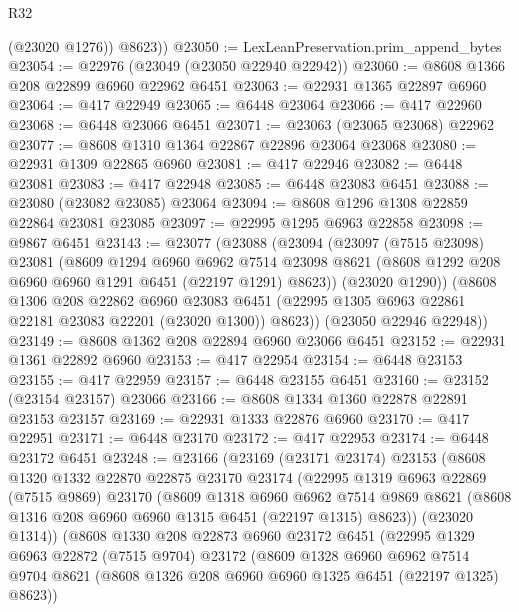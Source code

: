 \begin{lexlean}{R32}
\begin{coremodule}
          (@23020 @1276))
        @8623))
@23050 := LexLeanPreservation.prim_append_bytes
@23054 := @22976 (@23049 (@23050 @22940 @22942))
@23060 := @8608 @1366 @208 @22899 @6960 @22962 @6451
@23063 := @22931 @1365 @22897 @6960
@23064 := @417 @22949
@23065 := @6448 @23064
@23066 := @417 @22960
@23068 := @6448 @23066 @6451
@23071 := @23063 (@23065 @23068) @22962
@23077 := @8608 @1310 @1364 @22867 @22896 @23064 @23068
@23080 := @22931 @1309 @22865 @6960
@23081 := @417 @22946
@23082 := @6448 @23081
@23083 := @417 @22948
@23085 := @6448 @23083 @6451
@23088 := @23080 (@23082 @23085) @23064
@23094 := @8608 @1296 @1308 @22859 @22864 @23081 @23085
@23097 := @22995 @1295 @6963 @22858
@23098 := @9867 @6451
@23143 := @23077
    (@23088
      (@23094
        (@23097
          (@7515 @23098)
          @23081
          (@8609
            @1294
            @6960
            @6962
            @7514
            @23098
            @8621
            (@8608 @1292 @208 @6960 @6960 @1291 @6451 (@22197 @1291) @8623))
          (@23020 @1290))
        (@8608
          @1306
          @208
          @22862
          @6960
          @23083
          @6451
          (@22995 @1305 @6963 @22861 @22181 @23083 @22201 (@23020 @1300))
          @8623))
      (@23050 @22946 @22948))
@23149 := @8608 @1362 @208 @22894 @6960 @23066 @6451
@23152 := @22931 @1361 @22892 @6960
@23153 := @417 @22954
@23154 := @6448 @23153
@23155 := @417 @22959
@23157 := @6448 @23155 @6451
@23160 := @23152 (@23154 @23157) @23066
@23166 := @8608 @1334 @1360 @22878 @22891 @23153 @23157
@23169 := @22931 @1333 @22876 @6960
@23170 := @417 @22951
@23171 := @6448 @23170
@23172 := @417 @22953
@23174 := @6448 @23172 @6451
@23248 := @23166
    (@23169
      (@23171 @23174)
      @23153
      (@8608
        @1320
        @1332
        @22870
        @22875
        @23170
        @23174
        (@22995
          @1319
          @6963
          @22869
          (@7515 @9869)
          @23170
          (@8609
            @1318
            @6960
            @6962
            @7514
            @9869
            @8621
            (@8608 @1316 @208 @6960 @6960 @1315 @6451 (@22197 @1315) @8623))
          (@23020 @1314))
        (@8608
          @1330
          @208
          @22873
          @6960
          @23172
          @6451
          (@22995
            @1329
            @6963
            @22872
            (@7515 @9704)
            @23172
            (@8609
              @1328
              @6960
              @6962
              @7514
              @9704
              @8621
              (@8608 @1326 @208 @6960 @6960 @1325 @6451 (@22197 @1325) @8623))

\end{coremodule}
\end{lexlean}
